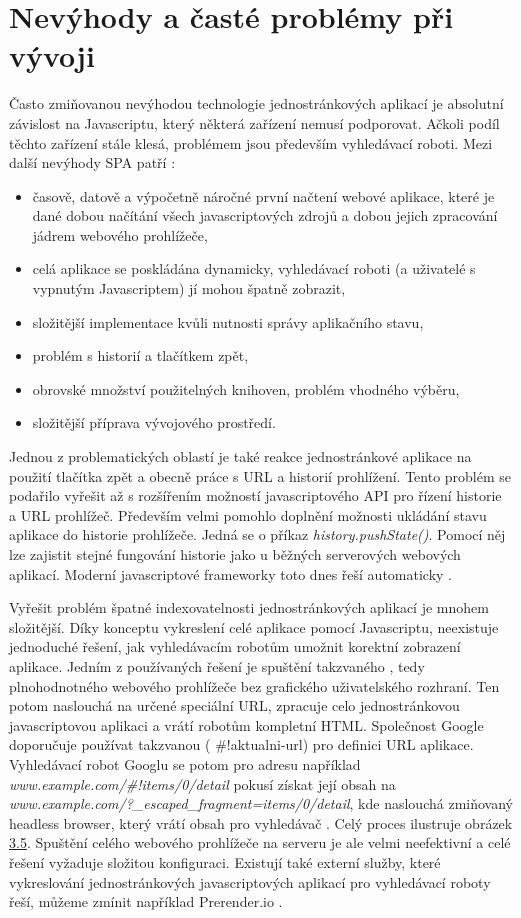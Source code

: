 \section{Nevýhody a časté problémy při vývoji}
Často zmiňovanou nevýhodou technologie jednostránkových aplikací je absolutní závislost na Javascriptu, který některá zařízení nemusí podporovat. Ačkoli podíl těchto zařízení stále klesá, problémem jsou především vyhledávací roboti. Mezi další nevýhody SPA patří \cite{spa_horyna}:

\begin{itemize}
\item časově, datově a výpočetně náročné první načtení webové aplikace, které je dané dobou načítání všech javascriptových zdrojů a dobou jejich zpracování jádrem webového prohlížeče,
\item celá aplikace se poskládána dynamicky, vyhledávací roboti (a uživatelé s vypnutým Javascriptem) jí mohou špatně zobrazit,
\item složitější implementace kvůli nutnosti správy aplikačního stavu,
\item problém s historií a tlačítkem zpět,
\item obrovské množství použitelných knihoven, problém vhodného výběru,
\item složitější příprava vývojového prostředí.
\end{itemize}

Jednou z problematických oblastí je také reakce jednostránkové aplikace na použití tlačítka zpět a obecně práce s URL a historií prohlížení. Tento problém se podařilo vyřešit až s rozšířením možností javascriptového API pro řízení historie a URL prohlížeč. Především velmi pomohlo doplnění možnosti ukládání stavu aplikace do historie prohlížeče. Jedná se o příkaz \textit{history.pushState()}. Pomocí něj lze zajistit stejné fungování historie jako u běžných serverových webových aplikací. Moderní javascriptové frameworky toto dnes řeší automaticky \cite{spa_book}.

Vyřešit problém špatné indexovatelnosti jednostránkových aplikací je mnohem složitější. Díky konceptu vykreslení celé aplikace pomocí Javascriptu, neexistuje jednoduché řešení, jak vyhledávacím robotům umožnit korektní zobrazení aplikace. Jedním z používaných řešení je spuštění takzvaného , tedy plnohodnotného webového prohlížeče bez grafického uživatelského rozhraní. Ten potom naslouchá na určené speciální URL, zpracuje celo jednostránkovou javascriptovou aplikaci a vrátí robotům kompletní HTML. Společnost Google doporučuje používat takzvanou  
( \#!aktualni-url) pro definici URL aplikace. Vyhledávací robot Googlu se potom pro adresu například 
\textit{www.example.com/\#!items/0/detail} pokusí získat její obsah na 
\textit{www.example.com/?\_escaped\_fragment=items/0/detail}, kde naslouchá zmiňovaný headless browser, který vrátí obsah pro vyhledávač \cite{google_crawler}. Celý proces ilustruje obrázek 
\hyperref[fig:prerender]{3.5}. Spuštění celého webového prohlížeče na serveru je ale velmi neefektivní a celé řešení vyžaduje složitou konfiguraci. Existují také externí služby, které vykreslování jednostránkových javascriptových aplikací pro vyhledávací roboty řeší, můžeme zmínit například Prerender.io \cite{prerender}. 

